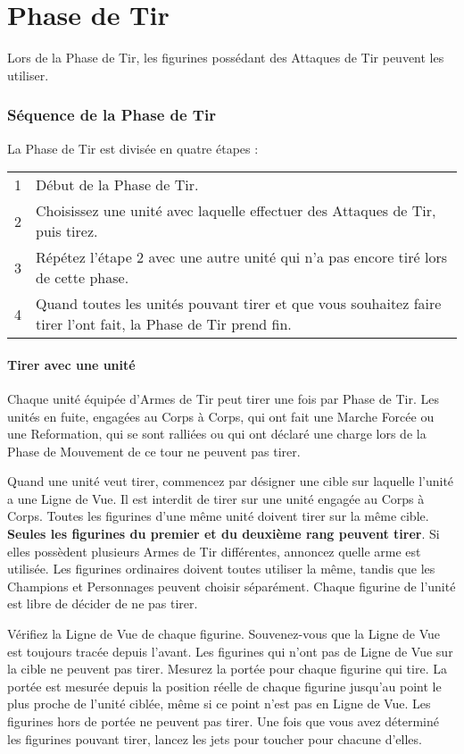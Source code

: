 
\hypertarget{shootingphase}{\part{Phase de Tir}}

Lors de la Phase de Tir, les figurines possédant des Attaques de Tir peuvent les utiliser.

\section{Séquence de la Phase de Tir}

La Phase de Tir est divisée en quatre étapes :

\hspace*{0.3cm}
\begin{tabular}{c|m{14cm}}
1 & Début de la Phase de Tir. \tabularnewline
2 & Choisissez une unité avec laquelle effectuer des Attaques de Tir, puis tirez. \tabularnewline
3 & Répétez l'étape 2 avec une autre unité qui n'a pas encore tiré lors de cette phase. \tabularnewline
4 & Quand toutes les unités pouvant tirer et que vous souhaitez faire tirer l'ont fait, la Phase de Tir prend fin. \tabularnewline
\end{tabular}

\subsection{Tirer avec une unité}

Chaque unité équipée d'Armes de Tir peut tirer une fois par Phase de Tir. Les unités en fuite, engagées au Corps à Corps, qui ont fait une Marche Forcée ou une Reformation, qui se sont ralliées ou qui ont déclaré une charge lors de la Phase de Mouvement de ce tour ne peuvent pas tirer.

Quand une unité veut tirer, commencez par désigner une cible sur laquelle l'unité a une Ligne de Vue. Il est interdit de tirer sur une unité engagée au Corps à Corps. Toutes les figurines d'une même unité doivent tirer sur la même cible. \textbf{Seules les figurines du premier et du deuxième rang peuvent tirer}. Si elles possèdent plusieurs Armes de Tir différentes, annoncez quelle arme est utilisée. Les figurines ordinaires doivent toutes utiliser la même, tandis que les Champions et Personnages peuvent choisir séparément. Chaque figurine de l'unité est libre de décider de ne pas tirer.

Vérifiez la Ligne de Vue de chaque figurine. Souvenez-vous que la Ligne de Vue est toujours tracée depuis l'avant. Les figurines qui n'ont pas de Ligne de Vue sur la cible ne peuvent pas tirer. Mesurez la portée pour chaque figurine qui tire. La portée est mesurée depuis la position réelle de chaque figurine jusqu'au point le plus proche de l'unité ciblée, même si ce point n'est pas en Ligne de Vue. Les figurines hors de portée ne peuvent pas tirer. Une fois que vous avez déterminé les figurines pouvant tirer, lancez les jets pour toucher pour chacune d'elles.

